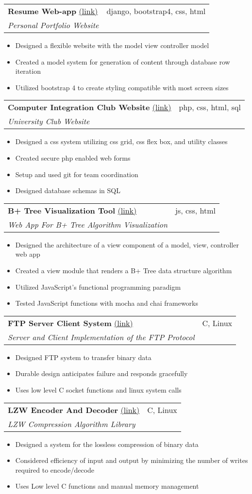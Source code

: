 \documentclass[letterpaper,11pt]{article}
\makeatletter
\newcommand{\resumeItem}[2]{
  \item\small{
    \textbf{#1}{ #2 \vspace{-2pt}}
  }
}
\newcommand{\resumeSubheading}[5]{
  \vspace{-1pt}\item
    \begin{tabular*}{0.97\textwidth}[t]{l@{\extracolsep{\fill}}r}
      \textbf{#1} #2 & #3 \\
      \textit{\small#4} & \textit{\small #5} \\
    \end{tabular*}\vspace{-5pt}
}
\newcommand{\resumeSubItem}[2]{\resumeItem{#1}{#2}\vspace{-4pt}}
\newcommand{\resumeItemListStart}{\begin{itemize}[leftmargin=*]}
\newcommand{\resumeItemListEnd}{\end{itemize}\vspace{-5pt}}
\makeatother
\begin{document}
  \resumeSubheading{Resume Web-app}{\href{http://www.treverhibbs.com/}{(link)}}{django, bootstrap4, css, html}{Personal Portfolio Website}{}
  \resumeItemListStart
    \resumeSubItem{}{Designed a flexible website with the model view controller model}
    \resumeSubItem{}{Created a model system for generation of content through database row iteration}
    \resumeSubItem{}{Utilized bootstrap 4 to create styling compatible with most screen sizes}
  \resumeItemListEnd

  \resumeSubheading{Computer Integration Club Website}{\href{http://www6.encs.vancouver.wsu.edu/}{(link)}}{php, css, html, sql}{University Club Website}{}
  \resumeItemListStart
    \resumeSubItem{}{Designed a css system utilizing css grid, css flex box, and utility classes}
    \resumeSubItem{}{Created secure php enabled web forms}
    \resumeSubItem{}{Setup and used git for team coordination}
  \resumeSubItem{}{Designed database schemas in SQL}
  \resumeItemListEnd
  
  \resumeSubheading{B+ Tree Visualization Tool}{\href{https://github.com/TreverHibbs/BPlusTree}{(link)}}{js, css, html}{Web App For B+ Tree Algorithm Visualization}{}
  \resumeItemListStart
    \resumeSubItem{}{Designed the architecture of a view component of a model, view, controller web app}
    \resumeSubItem{}{Created a view module that renders a B+ Tree data structure algorithm}
    \resumeSubItem{}{Utilized JavaScript's functional programming paradigm}
  \resumeSubItem{}{Tested JavaScript functions with mocha and chai frameworks}
  \resumeItemListEnd

  \resumeSubheading{FTP Server Client System}{\href{https://github.com/dbutler12/FTP}{(link)}}{C, Linux}{Server and Client Implementation of the FTP Protocol}{}
    \resumeItemListStart
      \resumeSubItem{}{Designed FTP system to transfer binary data}
      \resumeSubItem{}{Durable design anticipates failure and responds gracefully}
      \resumeSubItem{}{Uses low level C socket functions and linux system calls}
    \resumeItemListEnd

  \resumeSubheading{LZW Encoder And Decoder}{\href{https://github.com/dbutler12/LZW-Encoding}{(link)}}{C, Linux}{LZW Compression Algorithm Library}{}
    \resumeItemListStart
      \resumeSubItem{}{Designed a system for the lossless compression of binary data}
      \resumeSubItem{}{Considered efficiency of input and output by minimizing the number of writes required to encode/decode}
      \resumeSubItem{}{Uses Low level C functions and manual memory management}
    \resumeItemListEnd
\end{document}
